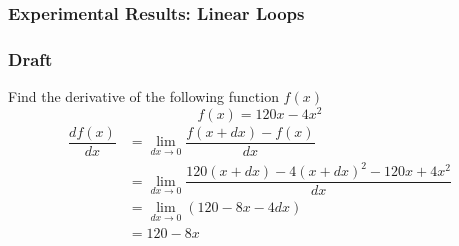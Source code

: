 \documentclass[11pt]{beamer}
\begin{document}
\begin{frame}\frametitle{Experimental Results: Linear Loops}
\end{frame}


\begin{frame}\frametitle{Draft}
Find the derivative of the following function $f(x)$
\[f(x) = 120x - 4x^2\]
\begin{align*}
\dfrac{df(x)}{dx} &= \lim_{dx\rightarrow 0}\dfrac{f(x + dx) - f(x)}{dx}\\
&= \lim_{dx\rightarrow 0}\dfrac{120(x+dx) - 4(x+dx)^2 -120x + 4x^2}{dx}\\
&= \lim_{dx\rightarrow 0}(120 - 8x - 4dx)\\
&= 120 - 8x\\
\end{align*}

\end{frame}
\end{document}
